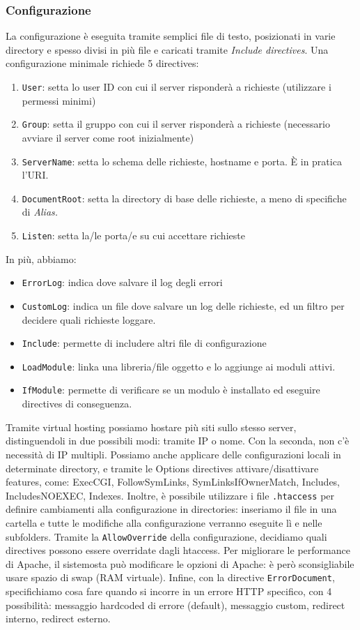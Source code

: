 \documentclass[11pt]{article}
\newcommand{\code}[1]{\texttt{#1}}
\begin{document}
\subsubsection{Configurazione}
La configurazione è eseguita tramite semplici file di testo, posizionati in varie directory e spesso divisi in più file e caricati tramite \textit{Include directives}. Una configurazione minimale richiede 5 directives:
\begin{enumerate}
    \item \code{User}: setta lo user ID con cui il server risponderà a richieste (utilizzare i permessi minimi)
    \item \code{Group}: setta il gruppo con cui il server risponderà a richieste (necessario avviare il server come root inizialmente)
    \item \code{ServerName}: setta lo schema delle richieste, hostname e porta. È in pratica l'URI.
    \item \code{DocumentRoot}: setta la directory di base delle richieste, a meno di specifiche di \textit{Alias.}
    \item \code{Listen}: setta la/le porta/e su cui accettare richieste
\end{enumerate}
In più, abbiamo:
\begin{itemize}
    \item \code{ErrorLog}: indica dove salvare il log degli errori
    \item \code{CustomLog}: indica un file dove salvare un log delle richieste, ed un filtro per decidere quali richieste loggare.
    \item \code{Include}: permette di includere altri file di configurazione
    \item \code{LoadModule}: linka una libreria/file oggetto e lo aggiunge ai moduli attivi.
    \item \code{IfModule}: permette di verificare se un modulo è installato ed eseguire directives di conseguenza.
\end{itemize}
Tramite virtual hosting possiamo hostare più siti sullo stesso server, distinguendoli in due possibili modi: tramite IP o nome. Con la seconda, non c'è necessità di IP multipli. 
Possiamo anche applicare delle configurazioni locali in determinate directory, e tramite le Options directives attivare/disattivare features, come: ExecCGI, FollowSymLinks, SymLinksIfOwnerMatch, Includes, IncludesNOEXEC, Indexes.
Inoltre, è possibile utilizzare i file \code{.htaccess} per definire cambiamenti alla configurazione in directories: inseriamo il file in una cartella e tutte le modifiche alla configurazione verranno eseguite lì e nelle subfolders. Tramite la \code{AllowOverride} della configurazione, decidiamo quali directives possono essere overridate dagli htaccess. Per migliorare le performance di Apache, il sistemosta può modificare le opzioni di Apache: è però sconsigliabile usare spazio di swap (RAM virtuale). Infine, con la directive \code{ErrorDocument}, specifichiamo cosa fare quando si incorre in un errore HTTP specifico, con 4 possibilità: messaggio hardcoded di errore (default), messaggio custom, redirect interno, redirect esterno.
\end{document}
